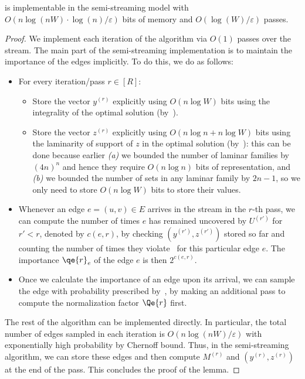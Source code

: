 \documentclass{theoretics}
\newcommand{\eps}{\varepsilon}
\begin{document}
\begin{lemma}\label{lem:semi-stream-general}
	 is implementable in the semi-streaming model with $\!O(n \log(nW) \cdot \log{\!(n)}/\eps)$ bits of memory and $O(\log{\!(W)}/\eps)$ passes. 
\end{lemma}
\begin{proof}
	

	We implement each iteration of the algorithm via $O(1)$ passes over the stream. The main part of the semi-streaming implementation is to maintain the importance of the edges implicitly. To do this, we do as follows: 
	\begin{itemize}[leftmargin=10pt]
	\item For every iteration/pass $r \in [R]$: 
	\begin{itemize}
		\item Store the vector $y^{(r)}$ explicitly using $O(n\log{W})$ bits using the integrality of the optimal solution (by~). 
		\item Store the vector $z^{(r)}$ explicitly using $O(n\log{n} + n\log{W})$ bits using the laminarity of support of $z$ in the optimal solution (by~): this can be done
		because earlier \emph{(a)} we bounded the number of laminar families by $(4n)^n$ and hence they require $O(n\log{n})$ bits of representation, and \emph{(b)} we bounded the number of sets in any laminar family
		by $2n-1$, so we only need to store $O(n\log{W})$ bits to store their values. 
	\end{itemize}
	\item Whenever an edge $e=(u,v) \in E$ arrives in the stream in the $r$-th pass, we can compute the number of times $e$ has remained uncovered by $U^{(r')}$ for $r' < r$, denoted by $c(e,r)$, by checking $(y^{(r')},z^{(r')})$ stored
	so far and counting the number of times they violate~ for this particular edge $e$. The importance $\qe{r}_e$ of the edge $e$ is then $2^{c(e,r)}$. 
	\item Once we calculate the importance of an edge upon its arrival, we can sample the edge with probability prescribed by~, by making an additional pass to compute the normalization factor $\Qe{r}$ first. 
	\end{itemize} 
	
	The rest of the algorithm can be implemented directly. In particular, the total number of edges sampled in each iteration is $O(n\log\!{(nW)}/\eps)$ with exponentially high probability by Chernoff bound. Thus, in the semi-streaming algorithm, 
	we can store these edges and then compute $M^{(r)}$ and $(y^{(r)},z^{(r)})$ at the end of the pass. This concludes the proof of the lemma. 
\end{proof}
\end{document}
